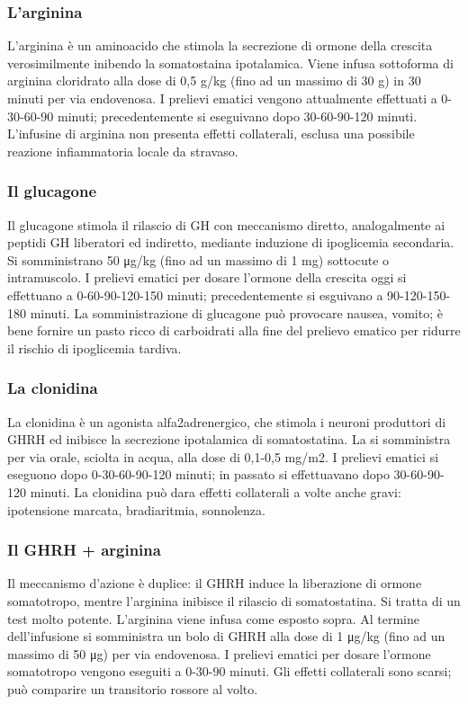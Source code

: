 \subsubsection*{L'arginina}
L'arginina è un aminoacido che stimola la secrezione di ormone della crescita verosimilmente inibendo la somatostaina ipotalamica. Viene infusa sottoforma di arginina cloridrato alla dose di 0,5 g/kg (fino ad un massimo di 30 g) in 30 minuti per via endovenosa. I prelievi ematici vengono attualmente effettuati a 0-30-60-90 minuti; precedentemente si eseguivano dopo 30-60-90-120 minuti. L'infusine di arginina non presenta effetti collaterali, esclusa una possibile reazione infiammatoria locale da stravaso.

\subsubsection*{Il glucagone}
Il glucagone stimola il rilascio di GH con meccanismo diretto, analogalmente ai peptidi GH liberatori ed indiretto, mediante induzione di ipoglicemia secondaria. Si somministrano 50 \unit{\micro g}/kg (fino ad un massimo di 1 mg) sottocute o intramuscolo. I prelievi ematici per dosare l'ormone della crescita oggi si effettuano a 0-60-90-120-150 minuti; precedentemente si esguivano a 90-120-150-180 minuti. La somministrazione di glucagone può provocare nausea, vomito; è bene fornire un pasto ricco di carboidrati alla fine del prelievo ematico per ridurre il rischio di ipoglicemia tardiva.

\subsubsection*{La clonidina}
La clonidina è un agonista alfa2adrenergico, che stimola i neuroni produttori di GHRH ed inibisce la secrezione ipotalamica di somatostatina. La si somministra per via orale, sciolta in acqua, alla dose di 0,1-0,5 mg/m2. I prelievi ematici si eseguono dopo 0-30-60-90-120 minuti; in passato si effettuavano dopo 30-60-90-120 minuti. La clonidina può dara effetti collaterali a volte anche gravi: ipotensione marcata, bradiaritmia, sonnolenza.
 
\subsubsection*{Il GHRH + arginina}
Il meccanismo d'azione è duplice: il GHRH induce la liberazione di ormone somatotropo, mentre l'arginina inibisce il rilascio di somatostatina. Si tratta di un test molto potente. L'arginina viene infusa come esposto sopra. Al termine dell'infusione si somministra un bolo di GHRH alla dose di 1 \unit{\micro g}/kg (fino ad un massimo di 50 \unit{\micro g}) per via endovenosa. I prelievi ematici per dosare l'ormone somatotropo vengono eseguiti a 0-30-90 minuti. Gli effetti collaterali sono scarsi; può comparire un transitorio rossore al volto.

